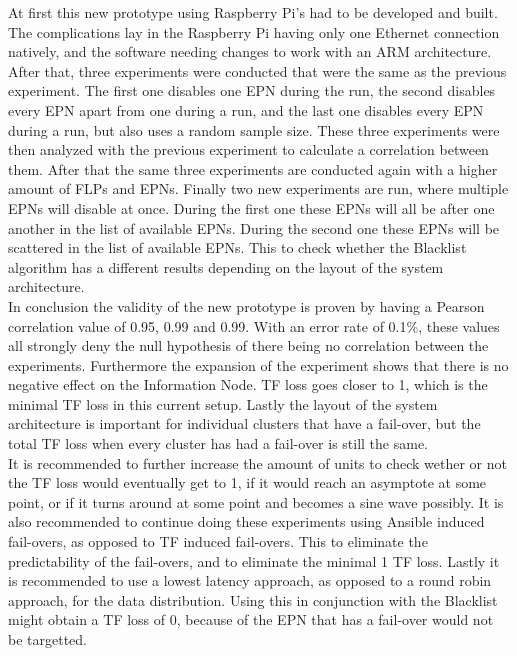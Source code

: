 At first this new prototype using Raspberry Pi's had to be developed and built. The complications lay in the Raspberry Pi having only one Ethernet connection natively, and the software needing changes to work with an ARM architecture. After that, three experiments were conducted that were the same as the previous experiment. The first one disables one EPN during the run, the second disables every EPN apart from one during a run, and the last one disables every EPN during a run, but also uses a random sample size. These three experiments were then analyzed with the previous experiment to calculate a correlation between them. After that the same three experiments are conducted again with a higher amount of FLPs and EPNs. Finally two new experiments are run, where multiple EPNs will disable at once. During the first one these EPNs will all be after one another in the list of available EPNs. During the second one these EPNs will be scattered in the list of available EPNs. This to check whether the Blacklist algorithm has a different results depending on the layout of the system architecture. \\
In conclusion the validity of the new prototype is proven by having a Pearson correlation value of 0.95, 0.99 and 0.99. With an error rate of 0.1\%, these values all strongly deny the null hypothesis of there being no correlation between the experiments. Furthermore the expansion of the experiment shows that there is no negative effect on the Information Node. TF loss goes closer to 1, which is the minimal TF loss in this current setup. Lastly the layout of the system architecture is important for individual clusters that have a fail-over, but the total TF loss when every cluster has had a fail-over is still the same. \\
It is recommended to further increase the amount of units to check wether or not the TF loss would eventually get to 1, if it would reach an asymptote at some point, or if it turns around at some point and becomes a sine wave possibly. It is also recommended to continue doing these experiments using Ansible induced fail-overs, as opposed to TF induced fail-overs. This to eliminate the predictability of the fail-overs, and to eliminate the minimal 1 TF loss. Lastly it is recommended to use a lowest latency approach, as opposed to a round robin approach, for the data distribution. Using this in conjunction with the Blacklist might obtain a TF loss of 0, because of the EPN that has a fail-over would not be targetted.